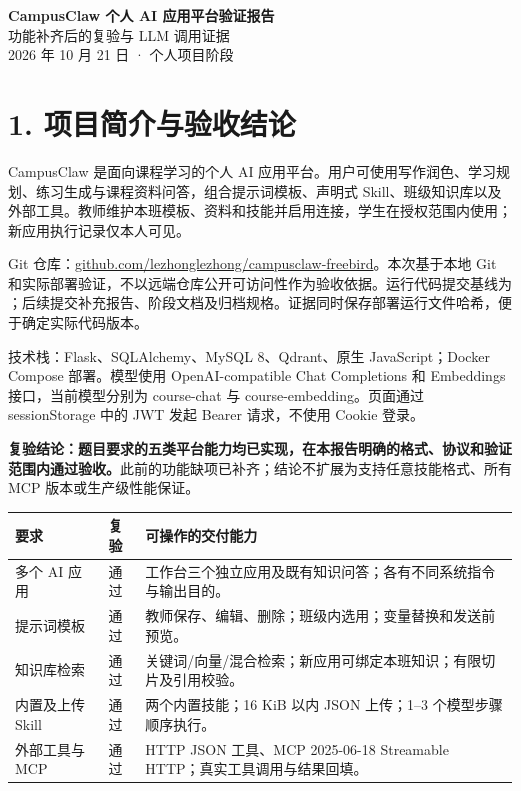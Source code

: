 \documentclass[UTF8,a4paper,10pt,fontset=fandol]{ctexart}
\newcommand{\code}[1]{\texttt{\detokenize{#1}}}
\begin{document}
\begin{center}
{\LARGE\bfseries CampusClaw 个人 AI 应用平台验证报告}\\[0.6em]
{\large 功能补齐后的复验与 LLM 调用证据}\\[0.5em]
2026 年 10 月 21 日 · 个人项目阶段
\end{center}
\section*{1. 项目简介与验收结论}
CampusClaw 是面向课程学习的个人 AI 应用平台。用户可使用写作润色、学习规划、练习生成与课程资料问答，组合提示词模板、声明式 Skill、班级知识库以及外部工具。教师维护本班模板、资料和技能并启用连接，学生在授权范围内使用；新应用执行记录仅本人可见。

Git 仓库：\href{https://github.com/lezhonglezhong/campusclaw-freebird}{github.com/lezhonglezhong/campusclaw-freebird}。本次基于本地 Git 和实际部署验证，不以远端仓库公开可访问性作为验收依据。运行代码提交基线为 \code{6a6f8f1}；后续提交补充报告、阶段文档及归档规格。证据同时保存部署运行文件哈希，便于确定实际代码版本。

技术栈：Flask、SQLAlchemy、MySQL 8、Qdrant、原生 JavaScript；Docker Compose 部署。模型使用 OpenAI-compatible Chat Completions 和 Embeddings 接口，当前模型分别为 course-chat 与 course-embedding。页面通过 sessionStorage 中的 JWT 发起 Bearer 请求，不使用 Cookie 登录。

\textbf{复验结论：题目要求的五类平台能力均已实现，在本报告明确的格式、协议和验证范围内通过验收。}此前的功能缺项已补齐；结论不扩展为支持任意技能格式、所有 MCP 版本或生产级性能保证。

\noindent\begin{tabularx}{\linewidth}{p{3.1cm}p{1.8cm}Y}
\toprule
要求 & 复验 & 可操作的交付能力\\\midrule
多个 AI 应用 & 通过 & 工作台三个独立应用及既有知识问答；各有不同系统指令与输出目的。\\
提示词模板 & 通过 & 教师保存、编辑、删除；班级内选用；变量替换和发送前预览。\\
知识库检索 & 通过 & 关键词/向量/混合检索；新应用可绑定本班知识；有限切片及引用校验。\\
内置及上传 Skill & 通过 & 两个内置技能；16 KiB 以内 JSON 上传；1–3 个模型步骤顺序执行。\\
外部工具与 MCP & 通过 & HTTP JSON 工具、MCP 2025-06-18 Streamable HTTP；真实工具调用与结果回填。\\\bottomrule
\end{tabularx}
\end{document}
